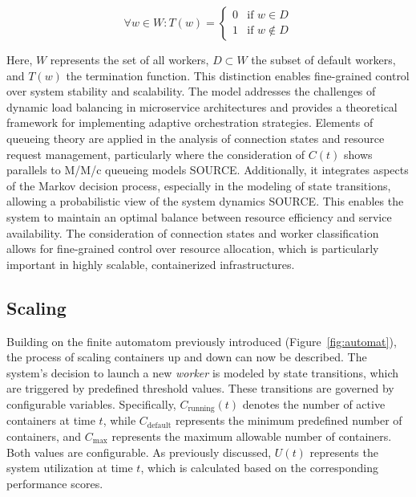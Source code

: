 \documentclass[twocolumn]{webofc}
\begin{document}
$$ \forall w \in W: T(w) = \begin{cases} 
0 & \text{if } w \in D \\
1 & \text{if } w \notin D
\end{cases} $$

Here, $W$ represents the set of all workers, $D \subset W$ the subset of default workers, and $T(w)$ the termination function. This distinction enables fine-grained control over system stability and scalability. The model addresses the challenges of dynamic load balancing in microservice architectures and provides a theoretical framework for implementing adaptive orchestration strategies. Elements of queueing theory are applied in the analysis of connection states and resource request management, particularly where the consideration of $C(t)$ shows parallels to M/M/c queueing models {\color{red} SOURCE}. Additionally, it integrates aspects of the Markov decision process, especially in the modeling of state transitions, allowing a probabilistic view of the system dynamics {\color{red} SOURCE}. This enables the system to maintain an optimal balance between resource efficiency and service availability. The consideration of connection states and worker classification allows for fine-grained control over resource allocation, which is particularly important in highly scalable, containerized infrastructures.

\subsection{Scaling}  
Building on the finite automatom previously introduced (Figure~\ref{fig:automat}), the process of scaling containers up and down can now be described. The system’s decision to launch a new \textit{worker} is modeled by state transitions, which are triggered by predefined threshold values. These transitions are governed by configurable variables. Specifically, \( C_{\text{running}}(t) \) denotes the number of active containers at time \( t \), while \( C_{\text{default}} \) represents the minimum predefined number of containers, and \( C_{\text{max}} \) represents the maximum allowable number of containers. Both values are configurable. As previously discussed, \( U(t) \) represents the system utilization at time \( t \), which is calculated based on the corresponding performance scores.
\end{document}
